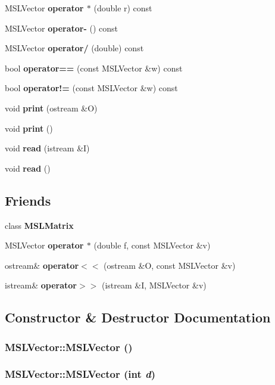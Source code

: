 \begin{CompactItemize}
\item 
MSLVector {\bf operator $\ast$} (double r) const
\item 
MSLVector {\bf operator-} () const
\item 
MSLVector {\bf operator/} (double) const
\item 
bool {\bf operator==} (const MSLVector \&w) const
\item 
bool {\bf operator!=} (const MSLVector \&w) const
\item 
void {\bf print} (ostream \&O)
\item 
void {\bf print} ()
\item 
void {\bf read} (istream \&I)
\item 
void {\bf read} ()
\end{CompactItemize}
\subsection*{Friends}
\begin{CompactItemize}
\item 
class {\bf MSLMatrix}
\item 
MSLVector {\bf operator $\ast$} (double f, const MSLVector \&v)
\item 
ostream\& {\bf operator$<$$<$} (ostream \&O, const MSLVector \&v)
\item 
istream\& {\bf operator$>$$>$} (istream \&I, MSLVector \&v)
\end{CompactItemize}


\subsection{Constructor \& Destructor Documentation}
\subsubsection{\setlength{\rightskip}{0pt plus 5cm}MSLVector::MSLVector ()}\label{classMSLVector_a0}


\subsubsection{\setlength{\rightskip}{0pt plus 5cm}MSLVector::MSLVector (int {\em d})}\label{classMSLVector_a1}


